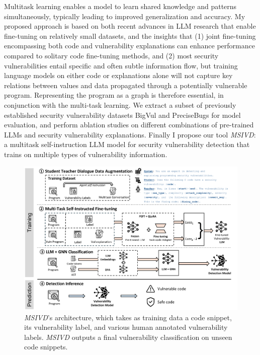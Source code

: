 \documentclass[12pt,openany,oneside,table]{cmuthesis}
\begin{document}
Multitask learning enables a model to learn shared knowledge and patterns simultaneously, typically leading to improved generalization and accuracy.
My proposed approach is based on both recent advances in LLM research that enable fine-tuning on relatively small datasets, and the insights that (1) joint fine-tuning encompassing both code and vulnerability explanations can enhance performance compared to solitary code fine-tuning methods, and (2) most security vulnerabilities entail specific and often subtle information flow, but training language models on either code or explanations alone will not capture key relations between values and data propagated through a potentially vulnerable program. Representing the program as a graph is therefore essential, in conjunction with the multi-task learning. We extract a subset of previously established security vulnerability datasets BigVul and PreciseBugs for model evaluation, and perform ablation studies on different combinations of pre-trained LLMs and security vulnerability explanations.
Finally I propose our tool \textit{MSIVD}: a multitask self-instruction LLM model for security vulnerability detection that trains on multiple types of vulnerability information.

\begin{figure}[t!]
\centering
\includegraphics[width=\textwidth]{figures/approach/Multitask-vuln.pdf}
\caption{\small \textit{MSIVD}’s architecture, which takes as training data a code snippet, its vulnerability label, and various human annotated vulnerability labels. \textit{MSIVD} outputs a final vulnerability classification on unseen code snippets.}
\label{fig:multivuln_overview}
\end{figure}
\end{document}
